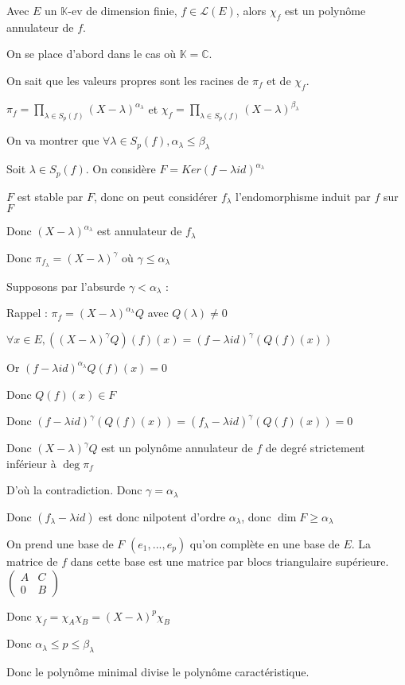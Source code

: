 \documentclass[a4paper,12pt]{book}
\newcommand{\Thr}[2]{\begin{tcolorbox}[sharp corners, colback=white,colframe=red!90!black!75, title=Théorème : #1]#2\end{tcolorbox}}
\newcommand{\Pre}[1]{\begin{tcolorbox}[sharp corners, colback=white,colframe=green!60!green!30!black!75, title=Preuve]#1\end{tcolorbox}}
\def\C{\mathbb{C}}
\def\K{\mathbb{K}}
\begin{document}
\Thr{Cayley-Hamilton}{Avec $E$ un $\K$-ev de dimension finie, $f\in\mathcal{L}(E)$, alors $\chi_f$ est un polynôme annulateur de $f$.}
\Pre{On se place d'abord dans le cas où $\K=\C$. \par On sait que les valeurs propres sont les racines de $\pi_f$ et de $\chi_f$. \par $\pi_f = \prod\limits_{\lambda\in S_p(f)}(X-\lambda)^{\alpha_\lambda}$ et $\chi_f=\prod\limits_{\lambda\in S_p(f)}(X-\lambda)^{\beta_\lambda}$ \par On va montrer que $\forall\lambda\in S_p(f), \alpha_\lambda\leq \beta_\lambda$ \par Soit $\lambda\in S_p(f)$. On considère $F=Ker(f-\lambda id)^{\alpha_\lambda}$ \par $F$ est stable par $F$, donc on peut considérer $f_\lambda$ l'endomorphisme induit par $f$ sur $F$
\par Donc $(X-\lambda)^{\alpha_\lambda}$ est annulateur de $f_\lambda$ \par Donc $\pi_{f_\lambda} = (X-\lambda)^\gamma$ où $\gamma\leq\alpha_\lambda$ \par Supposons par l'absurde $\gamma<\alpha_\lambda$ :\par Rappel : $\pi_f = (X-\lambda)^{\alpha_\lambda}Q$ avec $Q(\lambda)\neq 0$ \par $\forall x\in E, ((X-\lambda)^\gamma Q)(f)(x) = (f-\lambda id)^\gamma(Q(f)(x))$ \par Or $(f-\lambda id)^{\alpha_\lambda}Q(f)(x)=0$ \par Donc $Q(f)(x)\in F$ \par Donc $(f-\lambda id)^\gamma(Q(f)(x)) = (f_\lambda-\lambda id)^\gamma(Q(f)(x))=0$ \par Donc $(X-\lambda)^\gamma Q$ est un polynôme annulateur de $f$ de degré strictement inférieur à $\deg\pi_f$
\par D'où la contradiction. Donc $\gamma = \alpha_\lambda$ \par Donc $(f_\lambda - \lambda id)$ est donc nilpotent d'ordre $\alpha_\lambda$, donc $\dim F\geq \alpha_\lambda$ \par On prend une base de $F$ $(e_1,...,e_p)$ qu'on complète en une base de $E$. La matrice de $f$ dans cette base est une matrice par blocs triangulaire supérieure.$\begin{pmatrix}A & C \\ 0 & B\end{pmatrix}$ \par Donc $\chi_f = \chi_A\chi_B=(X-\lambda)^p\chi_B$ \par Donc $\alpha_\lambda\leq p\leq\beta_\lambda$ \par Donc le polynôme minimal divise le polynôme caractéristique.
}
\end{document}

